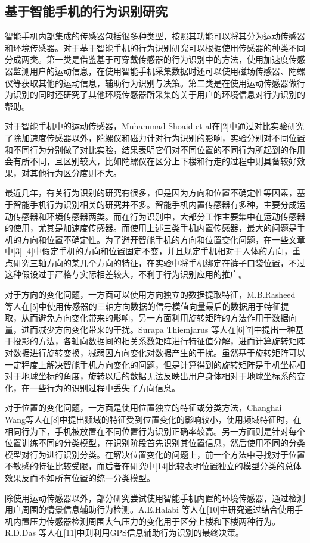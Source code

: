 \subsection{基于智能手机的行为识别研究}
\par 智能手机内部集成的传感器包括很多种类型，按照其功能可以将其分为运动传感器和环境传感器。对于基于智能手机的行为识别研究可以根据使用传感器的种类不同分成两类。第一类是借鉴基于可穿戴传感器的行为识别中的方法，使用加速度传感器监测用户的运动信息，在使用智能手机采集数据时还可以使用磁场传感器、陀螺仪等获取其他的运动信息，辅助行为识别与决策。第二类是在使用运动传感器做行为识别的同时还研究了其他环境传感器所采集的关于用户的环境信息对行为识别的帮助。
\par 对于智能手机中的运动传感器，Muhammad Shoaid et al在[2]中通过对比实验研究了除加速度传感器以外，陀螺仪和磁力计对行为识别的影响，实验分别对不同位置和不同行为分别做了对比实验，结果表明它们对不同位置的不同行为所起到的作用会有所不同，且区别较大，比如陀螺仪在区分上下楼和行走的过程中则具备较好效果，对其他行为区分度则不大。
\par 最近几年，有关行为识别的研究有很多，但是因为方向和位置不确定性等因素，基于智能手机行为识别相关的研究并不多。智能手机内置传感器有多种，主要分成运动传感器和环境传感器两类。而在行为识别中，大部分工作主要集中在运动传感器的使用，尤其是加速度传感器。而使用上述三类手机内置传感器，最大的问题是手机的方向和位置不确定性。为了避开智能手机的方向和位置变化问题，在一些文章中[3] [4]中假定手机的方向和位置固定不变，并且规定手机相对于人体的方向，重点研究三轴方向的某几个方向的特征，在实验中将手机绑定在裤子口袋位置，不过这种假设过于严格与实际相差较大，不利于行为识别应用的推广。
\par 对于方向的变化问题，一方面可以使用方向独立的数据提取特征，M.B.Rasheed 等人在[5]中使用传感器的三轴方向数据的信号模值向量最后的数据用于特征提取，从而避免方向变化带来的影响，另一方面利用旋转矩阵的方法作用于数据向量，进而减少方向变化带来的干扰。Surapa Thiemjarus 等人在[6][7]中提出一种基于投影的方法，各轴向数据间的相关系数矩阵进行特征值分解，进而计算旋转矩阵对数据进行旋转变换，减弱因方向变化对数据产生的干扰。虽然基于旋转矩阵可以一定程度上解决智能手机方向变化的问题，但是计算得到的旋转矩阵是手机坐标相对于地球坐标的角度，旋转以后的数据无法反映出用户身体相对于地球坐标系的变化，在一些行为的识别过程中丢失了方向信息。
\par 对于位置的变化问题，一方面是使用位置独立的特征或分类方法，Changhai Wang等人在[8]中提出频域的特征受到位置变化的影响较小，使用频域特征时，在相同行为下，手机被放置在不同位置行为识别正确率较高。另一方面则是针对每个位置训练不同的分类模型，在识别阶段首先识别其位置信息，然后使用不同的分类模型对行为进行识别分类。在解决位置变化的问题上，前一个方法中寻找对于位置不敏感的特征比较受限，而后者在研究中[14]比较表明位置独立的模型分类的总体效果反而不如所有位置的统一分类模型。
\par 除使用运动传感器以外，部分研究尝试使用智能手机内置的环境传感器，通过检测用户周围的情景信息辅助行为检测。A.E.Halabi 等人在[10]中研究通过结合使用手机内置压力传感器检测周围大气压力的变化用于区分上楼和下楼两种行为。R.D.Das 等人在[11]中则利用GPS信息辅助行为识别的最终决策。

